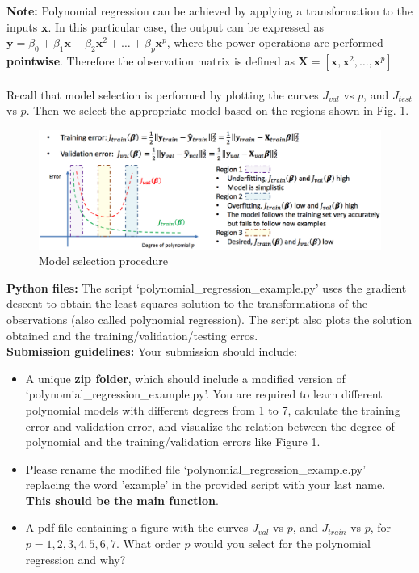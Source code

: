 \documentclass[11pt,oneside,a4paper]{article}
\begin{document}
\begin{enumerate}
  \textbf{Note:} Polynomial regression can be achieved by applying a transformation to the inputs $\textbf{x}$. In this particular case, the output can be expressed as $\textbf{y}=
  \beta_0+\beta_1\textbf{x}+\beta_2\textbf{x}^2+\dots+\beta_p\textbf{x}^p$, where the power operations are performed \textbf{pointwise}. Therefore the observation matrix is defined as $\textbf{X}=[\textbf{x},\textbf{x}^2,\dots, \textbf{x}^p]$
  \\
  \\
  Recall that model selection is performed by plotting the curves $J_{val}$ vs $p$, and $J_{test}$ vs $p$. Then we select the appropriate model based on the regions shown in Fig. 1.
    \begin{figure}\centering
  	\includegraphics[height=0.4\textwidth]{model_sel.eps}
  	\caption{Model selection procedure}
  	\label{fig:MINSTimages}
  \end{figure}
  
  \pagebreak
  
  \textbf{Python files:} The script `polynomial\_regression\_example.py' uses the gradient descent to obtain the least squares solution to the transformations of the observations (also called polynomial regression). 
  The script also plots the solution obtained and the training/validation/testing erros.
  \\
  \textbf{Submission guidelines:} Your submission should include:
  \begin{itemize}
  	\item A unique \textbf{zip folder}, which should include a modified version of `polynomial\_regression\_example.py'.  You are required to learn different polynomial models with different degrees from 1 to 7, calculate the training error and validation error, and visualize the relation between the degree of polynomial and the training/validation errors like Figure 1.
	
   \item Please rename the modified file `polynomial\_regression\_example.py' replacing the word 'example' in the provided script with your last name. \textbf{This should be the main function}.
  	\item A pdf file containing a figure with the curves $J_{val}$ vs $p$, and $J_{train}$ vs $p$, for $p=1,2,3,4,5,6,7$. What order $p$ would you select for the polynomial regression and why?
  \end{itemize}


\end{enumerate}
\end{document}
